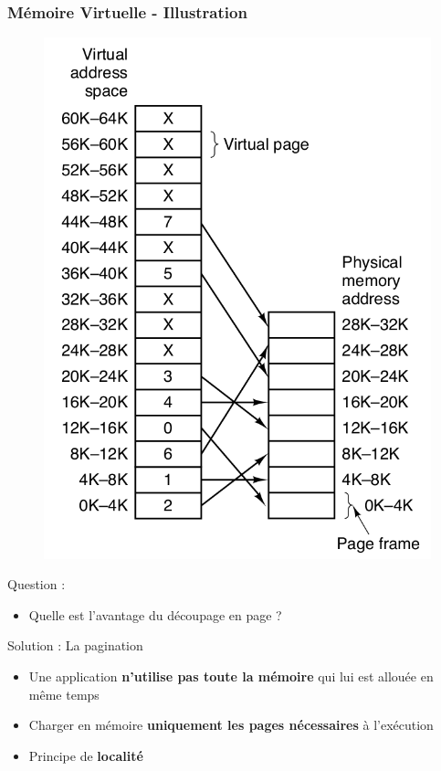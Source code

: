\documentclass[8pt]{beamer}
\begin{document}
\begin{frame}[c]
    \frametitle{Mémoire Virtuelle - Illustration}
    \begin{figure}
        \centering
        \includegraphics[width=.15\textwidth]{figures/page_table_wo.png}
    \end{figure}
    \begin{alertblock}{Question : }
        \begin{itemize}
            \item
                  Quelle est l'avantage du d\'ecoupage en page ?
        \end{itemize}
    \end{alertblock}
    \pause
    \begin{exampleblock}{Solution : La pagination}
        \begin{itemize}
            \item Une application \textbf{n'utilise pas toute la mémoire} qui
                  lui est
                  allouée en même
                  temps
            \item Charger en mémoire \textbf{uniquement les pages nécessaires}
                  à
                  l'exécution
            \item Principe de \textbf{localité}
        \end{itemize}
    \end{exampleblock}

\end{frame}
\end{document}
